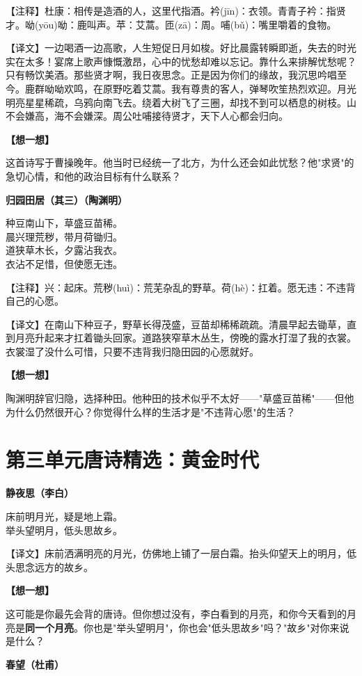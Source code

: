 \documentclass[a4paper,12pt]{ctexart}
\newcommand{\poemtitle}[1]{{\vspace{0.3cm}\noindent\textcolor{orange!80!black}{\large\bfseries #1}\par\vspace{0.1cm}}}
\newcommand{\annot}[1]{{\small\textcolor{blue!60!black}{#1}}}
\newcommand{\thinkq}{\vspace{0.2cm}\noindent\textcolor{orange!60!black}{\small\bfseries【想一想】}\par}
\begin{document}
\annot{【注释】杜康：相传是造酒的人，这里代指酒。衿(jīn)：衣领。青青子衿：指贤才。呦(yōu)呦：鹿叫声。苹：艾蒿。匝(zā)：周。哺(bǔ)：嘴里嚼着的食物。}

\annot{【译文】一边喝酒一边高歌，人生短促日月如梭。好比晨露转瞬即逝，失去的时光实在太多！宴席上歌声慷慨激昂，心中的忧愁却难以忘记。靠什么来排解忧愁呢？只有畅饮美酒。那些贤才啊，我日夜思念。正是因为你们的缘故，我沉思吟唱至今。鹿群呦呦欢鸣，在原野吃着艾蒿。我有尊贵的客人，弹琴吹笙热烈欢迎。月光明亮星星稀疏，乌鸦向南飞去。绕着大树飞了三圈，却找不到可以栖息的树枝。山不会嫌高，海不会嫌深。周公吐哺接待贤才，天下人心都会归向。}

\thinkq 这首诗写于曹操晚年。他当时已经统一了北方，为什么还会如此忧愁？他"求贤"的急切心情，和他的政治目标有什么联系？

\poemtitle{归园田居（其三）（陶渊明）}

种豆南山下，草盛豆苗稀。\\
晨兴理荒秽，带月荷锄归。\\
道狭草木长，夕露沾我衣。\\
衣沾不足惜，但使愿无违。

\annot{【注释】兴：起床。荒秽(huì)：荒芜杂乱的野草。荷(hè)：扛着。愿无违：不违背自己的心愿。}

\annot{【译文】在南山下种豆子，野草长得茂盛，豆苗却稀稀疏疏。清晨早起去锄草，直到月亮升起来才扛着锄头回家。道路狭窄草木丛生，傍晚的露水打湿了我的衣裳。衣裳湿了没什么可惜，只要不违背我归隐田园的心愿就好。}

\thinkq 陶渊明辞官归隐，选择种田。他种田的技术似乎不太好——"草盛豆苗稀"——但他为什么仍然很开心？你觉得什么样的生活才是"不违背心愿"的生活？

\newpage

\section*{\textcolor{orange!80!black}{第三单元\quad 唐诗精选：黄金时代}}

\poemtitle{静夜思（李白）}

床前明月光，疑是地上霜。\\
举头望明月，低头思故乡。

\annot{【译文】床前洒满明亮的月光，仿佛地上铺了一层白霜。抬头仰望天上的明月，低头思念远方的故乡。}

\thinkq 这可能是你最先会背的唐诗。但你想过没有，李白看到的月亮，和你今天看到的月亮是\textbf{同一个月亮}。你也是"举头望明月"，你也会"低头思故乡"吗？"故乡"对你来说是什么？

\poemtitle{春望（杜甫）}
\end{document}

